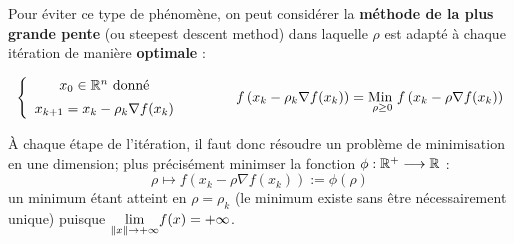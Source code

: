 Pour éviter ce type de phénomène, on peut considérer la \textbf{méthode de la
plus grande pente} (ou steepest descent method) dans laquelle $\rho$ est adapté
à chaque itération de manière \textbf{optimale} :

\[
    \begin{array}{cc}
        \left\lbrace
        \begin{array}{c}
            x_0 \in \mathbb{R}^n \text{ donné} \\[5pt]
            x_{k+1} = x_k - \rho_k \nabla f (x_k)
        \end{array}
        \right.
        & \hspace{1cm}
        f\left(x_k - \rho_k \nabla f(x_k)\right) = \underset{\rho \geq 0}{\text{Min }} f \left(x_k - \rho \nabla f(x_k) \right)
    \end{array}
\]

À chaque étape de l'itération, il faut donc résoudre un problème de minimisation
en une dimension; plus précisément minimser la fonction $\phi : \mathbb{R}^+ \longrightarrow \mathbb{R}$ :
\[
    \rho \mapsto f(x_k - \rho \nabla f(x_k) ) := \phi (\rho)
\]
un minimum étant atteint en $\rho = \rho_k$ (le minimum existe sans être
nécessairement unique) puisque $\underset{\left\lVert x\right\rVert \to +\infty}{\lim} f(x) = +\infty$.


